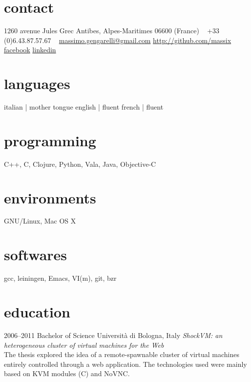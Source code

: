 \documentclass[]{friggeri-cv}
\begin{document}


\begin{aside} %
  \section{contact}
  1260 avenue Jules Grec
  Antibes, Alpes-Maritimes
  06600 (France)
  ~
  +33 (0)6.43.87.57.67
  ~
  \href{mailto:massimo.gengarelli@gmail.com}{massimo.gengarelli@gmail.com}
  \href{http://github.com/massix/}{http://github.com/massix}
  \href{http://facebook.com/massimo.gengarelli}{facebook}
  \href{http://fr.linkedin.com/pub/massimo-gengarelli/46/375/468/}{linkedin}
  \section{languages}
  italian | mother tongue
  english | fluent
  french  | fluent
  \section{programming}
  C++, C, Clojure, Python,
  Vala, Java, Objective-C
  \section{environments}
  GNU/Linux, Mac OS X
  \section{softwares}
  gcc, leiningen, Emacs,
  VI(m), git, bzr
\end{aside}


\section{education}

\begin{entrylist}
  \entry
      {2006--2011}
      {Bachelor {\normalfont of Science}}
      {Universit\`a di Bologna, Italy}
      {\emph{ShockVM: an heterogeneous cluster of virtual machines for the Web}
        \\
        The thesis explored the idea of a remote-spawnable cluster of virtual
        machines entirely controlled through a web application.  The
        technologies used were mainly based on KVM modules (C) and NoVNC.}
\end{entrylist}
\end{document}
